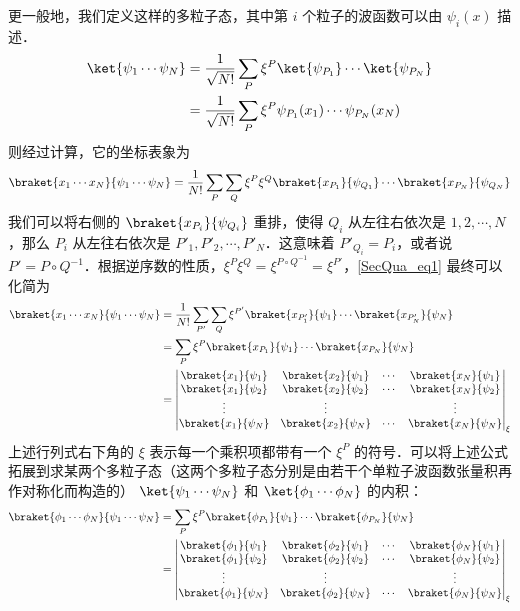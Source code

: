 更一般地，我们定义这样的多粒子态，其中第 $i$ 个粒子的波函数可以由 $\psi_i(x)$ 描述．
\begin{equation}
\begin{aligned}
\ket{\psi_1\cdots\psi_N}&=\frac{1}{\sqrt{N!}}\sum_P \xi^P\ket{\psi_{P_1}}\cdots \ket{\psi_{P_N}}\\
&=\frac{1}{\sqrt{N!}}\sum_P \xi^P\psi_{P_1}(x_1)\cdots \psi_{P_N}(x_N)
\end{aligned}
\end{equation}
则经过计算，它的坐标表象为
\begin{equation}\label{SecQua_eq1}
\braket{x_1\cdots x_N}{\psi_1\cdots\psi_N}=\frac{1}{N!}\sum_P\sum_Q \xi^P \xi^Q \braket{x_{P_1}}{\psi_{Q_1}}\cdots\braket{x_{P_N}}{\psi_{Q_N}}
\end{equation}
我们可以将右侧的 $\braket{x_{P_i}}{\psi_{Q_i}}$ 重排，使得 $Q_i$ 从左往右依次是 $1,2,\cdots,N$，那么 $P_i$ 从左往右依次是 $P'_1,P'_2,\cdots,P'_N$．这意味着 $P'_{Q_i}=P_i$，或者说 $P'=P\circ Q^{-1}$．根据逆序数的性质，$\xi^P\xi^Q=\xi^{P\circ Q^{-1}}=\xi^{P'}$，\autoref{SecQua_eq1}  最终可以化简为
\begin{equation}
\begin{aligned}
\braket{x_1\cdots x_N}{\psi_1\cdots\psi_N}&=\frac{1}{N!}\sum_{P'}\sum_Q \xi^{P'} \braket{x_{P'_1}}{\psi_{1}}\cdots\braket{x_{P'_N}}{\psi_{N}}\\
&=\sum_{P}\xi^P\braket{x_{P_1}}{\psi_{1}}\cdots\braket{x_{P_N}}{\psi_{N}}\\
&=\left|\begin{matrix}
\braket{x_1}{\psi_1} &\braket{x_2}{\psi_1} &\cdots &\braket{x_N}{\psi_1}\\
\braket{x_1}{\psi_2} &\braket{x_2}{\psi_2} &\cdots & \braket{x_N}{\psi_2}\\
\vdots & \vdots & & \vdots \\
\braket{x_1}{\psi_N} &\braket{x_2}{\psi_N} &\cdots & \braket{x_N}{\psi_N}
\end{matrix}\right|_\xi
\end{aligned}
\end{equation}
上述行列式右下角的 $\xi$ 表示每一个乘积项都带有一个 $\xi^P$ 的符号．可以将上述公式拓展到求某两个多粒子态（这两个多粒子态分别是由若干个单粒子波函数张量积再作对称化而构造的） $\ket{\psi_1\cdots\psi_N}$ 和 $\ket{\phi_1\cdots\phi_N}$ 的内积：
\begin{equation}\label{SecQua_eq2}
\begin{aligned}
\braket{\phi_1\cdots \phi_N}{\psi_1\cdots\psi_N}
&=\sum_{P}\xi^P\braket{\phi_{P_1}}{\psi_{1}}\cdots\braket{\phi_{P_N}}{\psi_{N}}\\
&=\left|\begin{matrix}
\braket{\phi_1}{\psi_1} &\braket{\phi_2}{\psi_1} &\cdots &\braket{\phi_N}{\psi_1}\\
\braket{\phi_1}{\psi_2} &\braket{\phi_2}{\psi_2} &\cdots & \braket{\phi_N}{\psi_2}\\
\vdots & \vdots & & \vdots \\
\braket{\phi_1}{\psi_N} &\braket{\phi_2}{\psi_N} &\cdots & \braket{\phi_N}{\psi_N}
\end{matrix}\right|_\xi
\end{aligned}
\end{equation}
